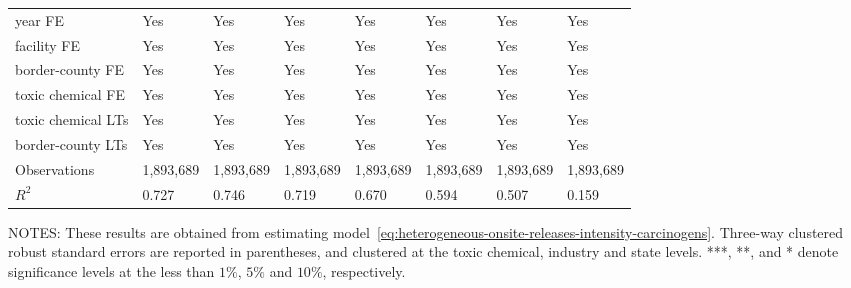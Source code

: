 \begin{table}[H]
{\begin{tabular}{@{}llllllll@{}}
            year FE                         & Yes       & Yes           & Yes       & Yes          & Yes             & Yes           & Yes                 \\
            facility FE                     & Yes       & Yes           & Yes       & Yes          & Yes             & Yes           & Yes                 \\
            border-county FE                & Yes       & Yes           & Yes       & Yes          & Yes             & Yes           & Yes                 \\
            toxic chemical FE               & Yes       & Yes           & Yes       & Yes          & Yes             & Yes           & Yes                 \\
            toxic chemical LTs              & Yes       & Yes           & Yes       & Yes          & Yes             & Yes           & Yes                 \\
            border-county LTs               & Yes       & Yes           & Yes       & Yes          & Yes             & Yes           & Yes                 \\\midrule
            Observations                    & 1,893,689 & 1,893,689     & 1,893,689 & 1,893,689    & 1,893,689       & 1,893,689     & 1,893,689           \\
            $R^2$                           & 0.727     & 0.746         & 0.719     & 0.670        & 0.594           & 0.507         & 0.159               \\ \bottomrule\bottomrule
        \end{tabular}%
    }
    \begin{minipage}{\columnwidth}
        \vspace{0.05in}
        \tiny NOTES: These results are obtained from estimating model~\ref{eq:heterogeneous-onsite-releases-intensity-carcinogens}. Three-way clustered robust standard errors are reported in parentheses, and clustered at the toxic chemical, industry and state levels. ***, **, and * denote significance levels at the less than $1\%$, $5\%$ and $10\%$, respectively.
    \end{minipage}
\end{table}